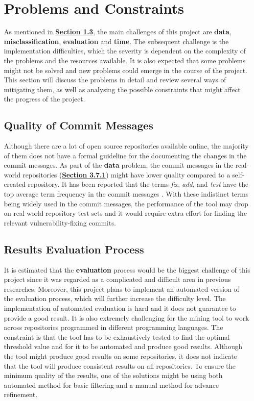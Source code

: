 \documentclass[12pt, a4paper]{report}
\begin{document}
\section{Problems and Constraints} \label{sec:problems_and_constraints}
As mentioned in \hyperref[sec:challenges]{\textbf{Section 1.3}}, the main challenges of this project
are \textbf{data}, \textbf{misclassification}, \textbf{evaluation} and \textbf{time}. The subsequent
challenge is the implementation difficulties, which the severity is dependent on the complexity of
the problems and the resources available. It is also expected that some problems might not be solved
and new problems could emerge in the course of the project. This section will discuss the problems
in detail and review several ways of mitigating them, as well as analysing the possible constraints
that might affect the progress of the project.

\subsection{Quality of Commit Messages} \label{subsec:commit_quality}
Although there are a lot of open source repositories available online, the majority of them does not
have a formal guideline for the documenting the changes in the commit messages. As part of the
\textbf{data} problem, the commit messages in the real-world repositories
(\hyperref[sec:realworld]{\textbf{Section 3.7.1}}) might have lower quality compared to a
self-created repository. It has been reported that the terms \textit{fix}, \textit{add}, and
\textit{test} have the top average term frequency in the commit messages \cite{alali_2008}. With
these indistinct terms being widely used in the commit messages, the performance of the tool may
drop on real-world repository test sets and it would require extra effort for finding the relevant
vulnerability-fixing commits.

\subsection{Results Evaluation Process}
It is estimated that the \textbf{evaluation} process would be the biggest challenge of this project
since it was regarded as a complicated and difficult area in previous researches. Moreover, this
project plans to implement an automated version of the evaluation process, which will further
increase the difficulty level. The implementation of automated evaluation is hard and it does not
guarantee to provide a good result. It is also extremely challenging for the mining tool to work
across repositories programmed in different programming languages. The constraint is that the tool
has to be exhaustively tested to find the optimal threshold value and for it to be automated and
produce good results. Although the tool might produce good results on some repositories, it does not
indicate that the tool will produce consistent results on all repositories. To ensure the minimum
quality of the results, one of the solutions might be using both automated method for basic
filtering and a manual method for advance refinement.
\end{document}
